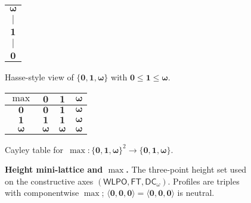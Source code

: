 \documentclass[11pt]{article}
\newcommand{\WLPO}{\mathsf{WLPO}}
\newcommand{\FT}{\mathsf{FT}}
\newcommand{\DCw}{\mathsf{DC}_{\omega}}
\newcommand{\hzero}{\mathbf{0}}
\newcommand{\hone}{\mathbf{1}}
\newcommand{\homega}{\boldsymbol{\omega}}
\newcommand{\allzero}{\langle \hzero,\hzero,\hzero\rangle}
\theoremstyle{plain}
\theoremstyle{definition}
\theoremstyle{remark}
\begin{document}
\begin{figure}[t]
  \centering
  \begin{minipage}[t]{0.40\linewidth}
    \centering
    \vspace{0.2em}
    \setlength{\tabcolsep}{6pt}
    \begin{tabular}{c}
      $\homega$ \\[-0.15em]
      \rule{0pt}{1.2em}$\mid$ \\[-0.15em]
      $\hone$ \\[-0.15em]
      \rule{0pt}{1.2em}$\mid$ \\[-0.15em]
      $\hzero$
    \end{tabular}

    \vspace{0.7em}
    \small Hasse-style view of $\{\hzero,\hone,\homega\}$ with $\hzero\le \hone\le \homega$.
  \end{minipage}\hfill
  \begin{minipage}[t]{0.55\linewidth}
    \centering
    \setlength{\tabcolsep}{8pt}
    \renewcommand{\arraystretch}{1.2}
    \begin{tabular}{c|ccc}
      $\max$ & $\hzero$ & $\hone$ & $\homega$ \\\hline
      $\hzero$ & $\hzero$ & $\hone$ & $\homega$ \\
      $\hone$  & $\hone$  & $\hone$ & $\homega$ \\
      $\homega$ & $\homega$ & $\homega$ & $\homega$ \\
    \end{tabular}

    \vspace{0.7em}
    \small Cayley table for $\,\max:\{\hzero,\hone,\homega\}^2\!\to\!\{\hzero,\hone,\homega\}$.
  \end{minipage}

  \caption{\textbf{Height mini-lattice and $\max$.}
  The three-point height set used on the constructive axes $(\WLPO,\FT,\DCw)$.
  Profiles are triples with componentwise $\max$; $\allzero=\langle\hzero,\hzero,\hzero\rangle$ is neutral.}
  \label{fig:height-lattice}
\end{figure}
\end{document}

